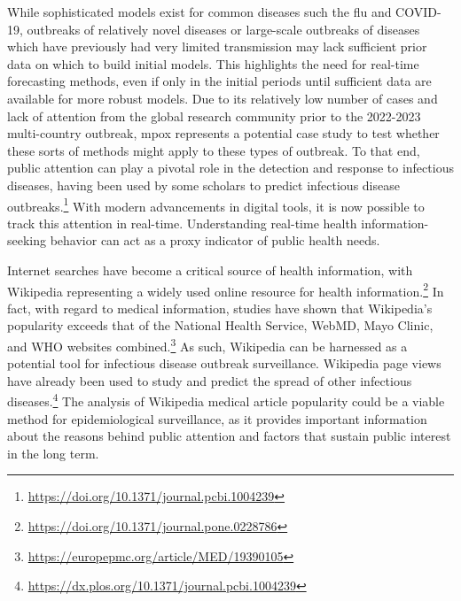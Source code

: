 \documentclass[
  letterpaper,
  DIV=11,
  numbers=noendperiod]{scrartcl}
\begin{document}
While sophisticated models exist for common diseases such the flu and
COVID-19, outbreaks of relatively novel diseases or large-scale
outbreaks of diseases which have previously had very limited
transmission may lack sufficient prior data on which to build initial
models. This highlights the need for real-time forecasting methods, even
if only in the initial periods until sufficient data are available for
more robust models. Due to its relatively low number of cases and lack
of attention from the global research community prior to the 2022-2023
multi-country outbreak, mpox represents a potential case study to test
whether these sorts of methods might apply to these types of outbreak.
To that end, public attention can play a pivotal role in the detection
and response to infectious diseases, having been used by some scholars
to predict infectious disease outbreaks.\footnote{\url{https://doi.org/10.1371/journal.pcbi.1004239}}
With modern advancements in digital tools, it is now possible to track
this attention in real-time. Understanding real-time health
information-seeking behavior can act as a proxy indicator of public
health needs.

Internet searches have become a critical source of health information,
with Wikipedia representing a widely used online resource for health
information.\footnote{\url{https://doi.org/10.1371/journal.pone.0228786}}
In fact, with regard to medical information, studies have shown that
Wikipedia's popularity exceeds that of the National Health Service,
WebMD, Mayo Clinic, and WHO websites combined.\footnote{\url{https://europepmc.org/article/MED/19390105}}
As such, Wikipedia can be harnessed as a potential tool for infectious
disease outbreak surveillance. Wikipedia page views have already been
used to study and predict the spread of other infectious
diseases.\footnote{\url{https://dx.plos.org/10.1371/journal.pcbi.1004239}}
The analysis of Wikipedia medical article popularity could be a viable
method for epidemiological surveillance, as it provides important
information about the reasons behind public attention and factors that
sustain public interest in the long term.
\end{document}
